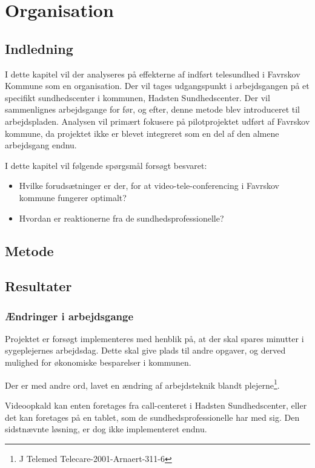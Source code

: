 \chapter{Organisation}

\section{Indledning}
I dette kapitel vil der analyseres på effekterne af indført telesundhed i Favrskov Kommune som en organisation. Der vil tages udgangspunkt i arbejdsgangen på et specifikt sundhedscenter i kommunen, Hadsten Sundhedscenter. Der vil sammenlignes arbejdsgange for før, og efter, denne metode blev introduceret til arbejdspladen. Analysen vil primært fokusere på pilotprojektet udført af Favrskov kommune, da projektet ikke er blevet integreret som en del af den almene arbejdsgang endnu. 

I dette kapitel vil følgende spørgsmål forsøgt besvaret:
\begin{itemize}
	\item Hvilke forudsætninger er der, for at video-tele-conferencing i Favrskov kommune fungerer optimalt? 
	\item Hvordan er reaktionerne fra de sundhedsprofessionelle? 
\end{itemize}

\section{Metode}

\section{Resultater}
\subsection{Ændringer i arbejdsgange}
Projektet er forsøgt implementeres med henblik på, at der skal spares minutter i sygeplejernes arbejdsdag. Dette skal give plads til andre opgaver, og derved mulighed for økonomiske besparelser i kommunen. 

Der er med andre ord, lavet en ændring af arbejdsteknik blandt plejerne\footnote{J Telemed Telecare-2001-Arnaert-311-6}.

Videoopkald kan enten foretages fra call-centeret i Hadsten Sundhedscenter, eller det kan foretages på en tablet, som de sundhedsprofessionelle har med sig. Den sidstnævnte løsning, er dog ikke implementeret endnu.

